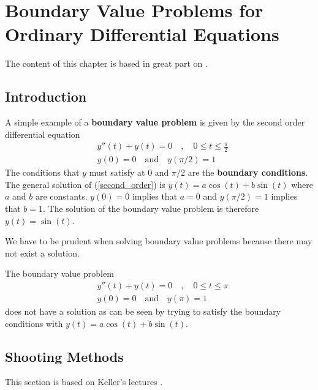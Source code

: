 \chapter[Boundary Value Problems]
{Boundary Value Problems for Ordinary Differential Equations}
\label{chapBoundValProbl}

The content of this chapter is based in great part on \cite{K}.

\section{Introduction}

\begin{egg}
A simple example of a
{\bfseries boundary value problem} is given by
the second order differential equation
\begin{align}
&y''(t) + y(t) = 0 \quad , \quad  0 \leq t \leq \frac{\pi}{2}
\label{second_order} \\
&y(0) = 0 \quad \text{and} \quad y(\pi/2) = 1 \nonumber
\end{align}
The conditions that $y$ must satisfy at $0$ and $\pi/2$ are the
{\bfseries boundary conditions}.  The
general solution of (\ref{second_order}) is
$y(t) = a\cos(t) + b\sin(t)$ where $a$ and $b$ are constants.
$y(0)=0$ implies that $a=0$ and $y(\pi/2) = 1$ implies that
$b=1$.  The solution of the boundary value problem is therefore
$y(t) = \sin(t)$.
\label{egg_BVP}
\end{egg}

We have to be prudent when solving boundary value problems
because there may not exist a solution.

\begin{egg}
The boundary value problem
\begin{align*}
& y''(t) + y(t) = 0 \quad , \quad  0 \leq t \leq \pi \\
& y(0) = 0 \quad \text{and} \quad y(\pi) = 1 \nonumber
\end{align*}
does not have a solution as can be seen by trying to satisfy the
boundary conditions with $y(t) = a\cos(t) + b\sin(t)$.
\end{egg}

\section{Shooting Methods}

This section is based on Keller's lectures \cite{K}.

